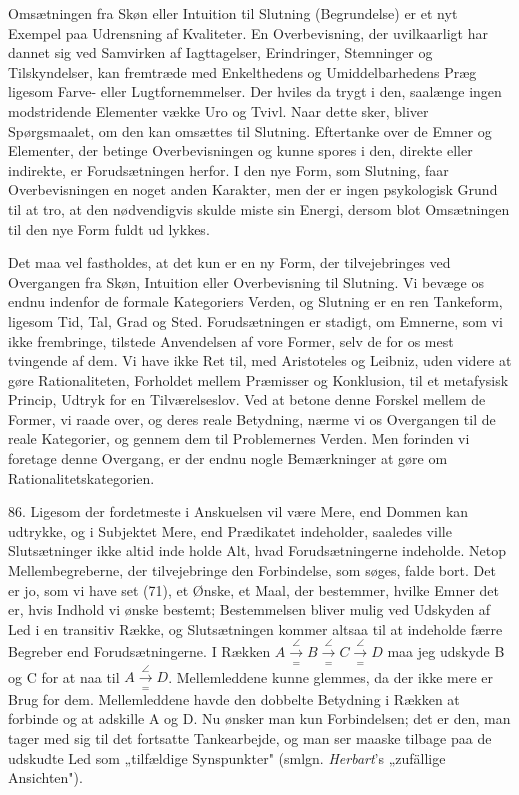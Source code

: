 \documentclass[12pt,a4paper]{book}
\newcommand{\opage}[1]{\marginnote{\footnotesize\textit{[#1]}}}
\begin{document}
Omsætningen fra Skøn eller Intuition til Slutning (Begrundelse) er et nyt Exempel
paa Udrensning af Kvaliteter. En Overbevisning, der uvilkaarligt har dannet sig
ved Samvirken af Iagttagelser, Erindringer, Stemninger og Tilskyndelser, kan
fremtræde med Enkelthedens og Umiddelbarhedens Præg ligesom Farve- eller
Lugtfornemmelser. Der hviles da trygt i den, saalænge ingen modstridende Elementer vække Uro og Tvivl. Naar dette sker, bliver Spørgsmaalet, om den kan
omsættes til Slutning. Eftertanke over de Emner og Elementer, der betinge
Overbevisningen og kunne spores i den, direkte eller indirekte, er
Forudsætningen herfor. I den nye Form, som Slutning, faar Overbevisningen en
noget anden Karakter, men der er ingen psykologisk Grund til at tro, at den
nødvendigvis skulde miste sin Energi, dersom blot Omsætningen til den nye Form
fuldt ud lykkes.

Det maa vel fastholdes, at det kun er en ny Form, der tilvejebringes ved
Overgangen fra Skøn, Intuition eller Overbevisning til Slutning. Vi bevæge os
endnu indenfor de formale Kategoriers Verden, og Slutning er en ren Tankeform,
ligesom Tid, Tal, Grad og Sted. Forudsætningen er stadigt, om Emnerne, som vi
ikke frembringe, tilstede Anvendelsen af vore Former, selv de for os mest
tvingende af dem. Vi have ikke Ret til, med Aristoteles og Leibniz, uden videre
at gøre Rationaliteten, Forholdet mellem Præmisser og Konklusion, til et
metafysisk Princip, Udtryk for en Tilværelseslov. Ved at betone denne Forskel
mellem de Former, vi raade over, og deres reale Betydning, nærme vi os Overgangen
til de reale Kategorier, og gennem dem til Problemernes Verden. Men forinden vi
foretage denne Overgang, er der endnu nogle Bemærkninger at gøre om
Rationalitetskategorien.

86. Ligesom der fordetmeste i Anskuelsen vil være Mere, end Dommen kan udtrykke,
og i Subjektet Mere, end Prædikatet indeholder, saaledes ville Slutsætninger ikke
altid inde%
\opage{206}holde Alt, hvad Forudsætningerne indeholde. Netop Mellembegreberne, der
tilvejebringe den Forbindelse, som søges, falde bort. Det er jo, som vi have set
(71), et Ønske, et Maal, der bestemmer, hvilke Emner det er, hvis Indhold vi
ønske bestemt; Bestemmelsen bliver mulig ved Udskyden af Led i en transitiv Række, og
Slutsætningen kommer altsaa til at indeholde færre Begreber end Forudsætningerne.
I Rækken $A \overset{\angle}{\underset{=}{\to}} B
\overset{\angle}{\underset{=}{\to}} C \overset{\angle}{\underset{=}{\to}} D$ maa
jeg udskyde B og C for at naa til $A \overset{\angle}{\underset{=}{\to}} D$.
Mellemleddene kunne glemmes, da der ikke mere er Brug for dem. Mellemleddene
havde den dobbelte Betydning i Rækken at forbinde og at adskille A og D. Nu
ønsker man kun Forbindelsen; det er den, man tager med sig til det fortsatte
Tankearbejde, og man ser maaske tilbage paa de udskudte Led som „tilfældige
Synspunkter" (smlgn. \emph{Herbart}'s „zufällige Ansichten").
\end{document}

